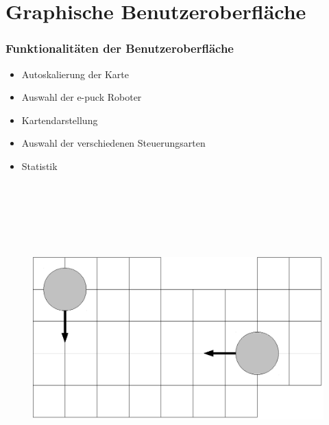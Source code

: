 \documentclass{beamer}
\begin{document}
\section{Graphische Benutzeroberfläche}
\begin{frame}
  \frametitle{Funktionalitäten der Benutzeroberfläche}
  	\begin{itemize}
		\item Autoskalierung der Karte
		\item Auswahl der e-puck Roboter
		\item Kartendarstellung
		\item Auswahl der verschiedenen Steuerungsarten
		\item Statistik
	\end{itemize}  
	\vspace{1cm}
	\begin{figure}[bp]
		\includegraphics[height=12cm]{images/karte.eps} 
	\end{figure}
\end{frame}
\end{document}
